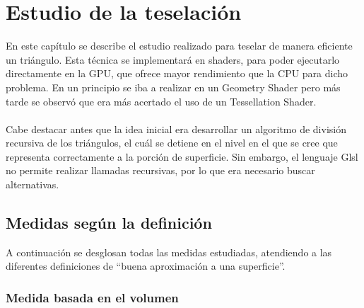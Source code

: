 
\chapter{Estudio de la teselación}

En este capítulo se describe el estudio realizado para teselar de manera eficiente un triángulo. Esta técnica se implementará en shaders, para poder ejecutarlo directamente en la GPU, que ofrece mayor rendimiento que la CPU para dicho problema. En un principio se iba a realizar en un Geometry Shader pero más tarde se observó que era más acertado el uso de un Tessellation Shader. \\
\\ Cabe destacar antes que la idea inicial era desarrollar un algoritmo de división recursiva de los triángulos, el cuál se detiene en el nivel en el que se cree que representa correctamente a la porción de superficie. Sin embargo, el lenguaje Glsl no permite realizar llamadas recursivas, por lo que era necesario buscar alternativas.

\section{Medidas según la definición}

	A continuación se desglosan todas las medidas estudiadas, atendiendo a las diferentes definiciones de ``buena aproximación a una superficie''.

	\subsection*{Medida basada en el volumen}
	
